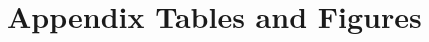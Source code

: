 \documentclass[12pt,pdftex]{article}
\def\thesection{\arabic{section}}
\begin{document}


%




\section{Appendix Tables and Figures}

\end{document}
